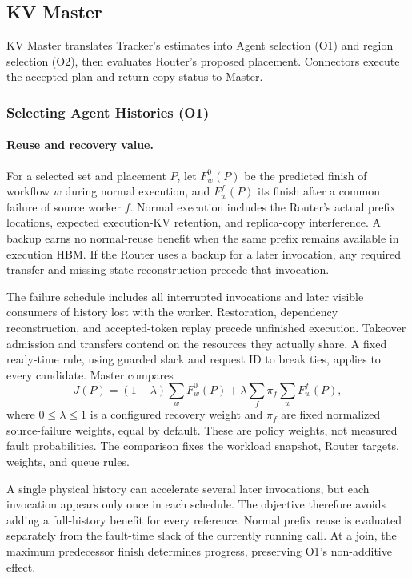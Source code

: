 \subsection{KV Master}
\label{sec:master}

KV Master translates Tracker's estimates into Agent selection (O1)
and region selection (O2), then evaluates Router's proposed placement.
Connectors execute the accepted plan and return copy status to Master.

\subsubsection{Selecting Agent Histories (O1)}
\label{sec:agent-protection}

\paragraph{Reuse and recovery value.}
For a selected set and placement $P$, let $F_w^0(P)$ be the predicted
finish of workflow $w$ during normal execution, and $F_w^f(P)$ its finish
after a common failure of source worker $f$. Normal execution includes
the Router's actual prefix locations, expected execution-KV retention,
and replica-copy interference. A backup earns no normal-reuse benefit
when the same prefix remains available in execution HBM. If the Router
uses a backup for a later invocation, any required transfer and
missing-state reconstruction precede that invocation.

The failure schedule includes all interrupted invocations and later
visible consumers of history lost with the worker. Restoration,
dependency reconstruction, and accepted-token replay precede unfinished
execution. Takeover admission and transfers contend on the resources
they actually share. A fixed ready-time rule, using guarded slack and
request ID to break ties, applies to every candidate. Master compares
\begin{equation}
 J(P)=(1-\lambda)\sum_w F_w^0(P)
       +\lambda\sum_f\pi_f\sum_w F_w^f(P),
 \label{eq:objective}
\end{equation}
where $0\le\lambda\le1$ is a configured recovery weight and $\pi_f$ are
fixed normalized source-failure weights, equal by default. These are
policy weights, not measured fault probabilities. The comparison fixes
the workload snapshot, Router targets, weights, and queue rules.

A single physical history can accelerate several later invocations,
but each invocation appears only once in each schedule. The objective
therefore avoids adding a full-history benefit for every reference.
Normal prefix reuse is evaluated separately from the fault-time slack
of the currently running call. At a join, the maximum predecessor
finish determines progress, preserving O1's non-additive effect.

